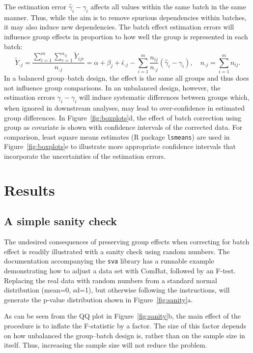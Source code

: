 \documentclass{bio}
\begin{document}
The estimation error $\hat\gamma_i-\gamma_i$ affects all values within the same batch in the same manner. Thus, while the aim is to remove spurious dependencies within batches, it may also induce new dependencies. The batch effect estimation errors will influence group effects in proportion to how well the group is represented in each batch:
\begin{equation}
\widetilde{Y}_{\textrm{-}j}
=\frac{\sum_{i=1}^m\sum_{r=1}^{n_{ij}}\widetilde{Y}_{ijr}}{n_{\textrm{-}j}}
=\alpha+\beta_j+\bar{\epsilon}_{\textrm{-}j}
  -\sum_{i=1}^m \frac{n_{ij}}{n_{\textrm{-}j}}(\hat{\gamma}_i-\gamma_i),
\quad
n_{\textrm{-}j}=\sum_{i=1}^m n_{ij}.
\end{equation}
In a balanced group--batch design, the effect is the same all groups and thus does not influence group comparisons. In an unbalanced design, however, the estimation errors $\hat\gamma_i-\gamma_i$ will induce systematic differences between groups which, when ignored in downstream analyses, may lead to over-confidence in estimated group differences. In Figure~\ref{fig:boxplots}d, the effect of batch correction using group as covariate is shown with confidence intervals of the corrected data. For comparison, least square means estimates (R package \texttt{lsmeans}) are used in Figure~\ref{fig:boxplots}e to illustrate more appropriate confidence intervals that incorporate the uncertainties of the estimation errors.


\section{Results}

\subsection{A simple sanity check}

The undesired consequences of preserving group effects when correcting for batch effect is readily illustrated with a sanity check using random numbers. The documentation accompanying the \texttt{sva} library has a runnable example demonstrating how to adjust a data set with ComBat, followed by an F-test. Replacing the real data with random numbers from a standard normal distribution (mean=0, sd=1), but otherwise following the instructions, will generate the p-value distribution shown in Figure~\ref{fig:sanity}a.

As can be seen from the QQ plot in Figure~\ref{fig:sanity}b, the main effect of the procedure is to inflate the F-statistic by a factor. The size of this factor depends on how unbalanced the group--batch design is, rather than on the sample size in itself. Thus, increasing the sample size will not reduce the problem.
\end{document}
